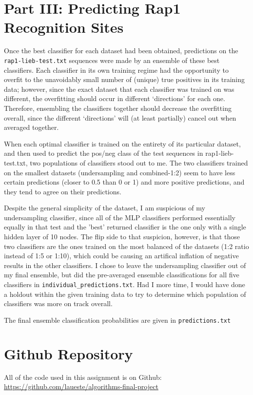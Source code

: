 \documentclass[12pt]{article}
\begin{document}
\section*{Part III: Predicting Rap1 Recognition Sites}
Once the best classifier for each dataset had been obtained, predictions on the \verb|rap1-lieb-test.txt| sequences were made by an ensemble of these best classifiers. Each classifier in its own training regime had the opportunity to overfit to the unavoidably small number of (unique) true positives in its training data; however, since the exact dataset that each classifier was trained on was different, the overfitting should occur in different `directions' for each one. Therefore, ensembling the classifiers together should decrease the overfitting overall, since the different `directions' will (at least partially) cancel out when averaged together.
\par When each optimal classifier is trained on the entirety of its particular dataset, and then used to predict the pos/neg class of the test sequences in rap1-lieb-test.txt, two populations of classifiers stood out to me. The two classifiers trained on the smallest datasets (undersampling and combined-1:2) seem to have less certain predictions (closer to 0.5 than 0 or 1) and more positive predictions, and they tend to agree on their predictions. 
\par Despite the general simplicity of the dataset, I am suspicious of my undersampling classifier, since all of the MLP classifiers performed essentially equally in that test and the 'best' returned classifier is the one only with a single hidden layer of 10 nodes. The flip side to that suspicion, however, is that those two classifiers are the ones trained on the most balanced of the datasets (1:2 ratio instead of 1:5 or 1:10), which could be causing an artifical inflation of negative results in the other classifiers. I chose to leave the undersampling classifier out of my final ensemble, but did the pre-averaged ensemble classifications for all five classifiers in \verb|individual_predictions.txt|. Had I more time, I would have done a holdout within the given training data to try to determine which population of classifiers was more on track overall.
\par The final ensemble classification probabilities are given in \verb|predictions.txt|
\section*{Github Repository}
All of the code used in this assignment is on Github: \url{https://github.com/laueste/algorithms-final-project}
\end{document}
